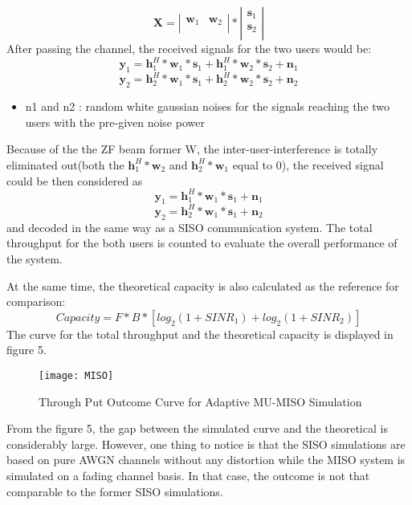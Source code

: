\documentclass[journal,comsoc]{IEEEtran}
\begin{document}
\[\textbf{X} = \left| \begin{array}{cc}
\textbf{w}_1 & \textbf{w}_2\\
\end{array} \right|*\left| \begin{array}{c}
\textbf{s}_1 \\
\textbf{s}_2 \\
\end{array} \right|\]
After passing the channel, the received signals for the two users would be:
\[\textbf{y}_1 = \textbf{h}_1^H * \textbf{w}_1 *\textbf{s}_1 + \textbf{h}_1^H * \textbf{w}_2*\textbf{s}_2 +\textbf{n}_1\]
\[\textbf{y}_2 = \textbf{h}_2^H * \textbf{w}_1 *\textbf{s}_1 + \textbf{h}_2^H * \textbf{w}_2*\textbf{s}_2 +\textbf{n}_2\]
\begin{itemize}
\item n1 and n2 : random white gaussian noises for the signals reaching the two users with the pre-given noise power
\end{itemize}
Because of the the ZF beam former W, the inter-user-interference is totally eliminated out(both the \(\textbf{h}_1^H * \textbf{w}_2\) and \(\textbf{h}_2^H * \textbf{w}_1\) equal to 0), the received signal could be then considered as
\[\textbf{y}_1 = \textbf{h}_1^H * \textbf{w}_1 *\textbf{s}_1 + \textbf{n}_1\]
\[\textbf{y}_2 = \textbf{h}_2^H * \textbf{w}_1 *\textbf{s}_1 + \textbf{n}_2\]
and decoded in the same way as a SISO communication system.
The total throughput for the both users is counted to evaluate the overall performance of the system.

At the same time, the theoretical capacity is also calculated as the reference for comparison:
\[Capacity= F * B * [log_2(1 + SINR_1)+log_2(1 + SINR_2)]\]
The curve for the total throughput and the theoretical capacity is displayed in figure 5.
\begin{figure}[!h]
    \centering
    \captionsetup{justification=centering}
    \label{fig_parabola}
	\texttt{[image: MISO]}
	\centering
	\caption{Through Put Outcome Curve for Adaptive MU-MISO Simulation}
\end{figure}

From the figure 5, the gap between the simulated curve and the theoretical is considerably large. However, one thing to notice is that the SISO simulations are based on pure AWGN channels without any distortion while the MISO system is simulated on a fading channel basis. In that case, the outcome is not that comparable to the former SISO simulations.
\end{document}
